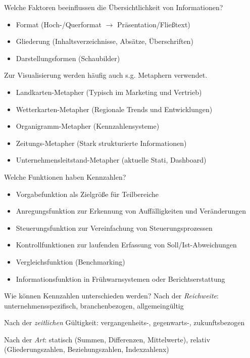 \documentclass[a6paper,10pt,grid=front%
,toc
]{kartei}
\begin{document}
  \begin{karte}{Welche Faktoren beeinflussen die Übersichtlichkeit von Informationen?}  

    \begin{itemize}
      \item Format (Hoch-/Querformat $\rightarrow$ Präsentation/Fließtext)
      \item Gliederung (Inhaltsverzeichnisse, Absätze, Überschriften)
      \item Darstellungsformen (Schaubilder)
    \end{itemize}

    Zur Visualisierung werden häufig auch s.g. Metaphern verwendet.

    \begin{itemize}
      \item Landkarten-Metapher (Typisch im Marketing und Vertrieb)
      \item Wetterkarten-Metapher (Regionale Trends und Entwicklungen)
      \item Organigramm-Metapher (Kennzahlensysteme)
      \item Zeitungs-Metapher (Stark strukturierte Informationen)
      \item Unternehmensleitstand-Metapher (aktuelle Stati, Dashboard)
    \end{itemize}
    
  \end{karte}

  \begin{karte}{Welche Funktionen haben Kennzahlen?}  
        
    \begin{itemize}
      \item Vorgabefunktion als Zielgröße für Teilbereiche
      \item Anregungsfunktion zur Erkennung von Auffälligkeiten und Veränderungen
      \item Steuerungsfunktion zur Vereinfachung von Steuerungsprozessen
      \item Kontrollfunktionen zur laufenden Erfassung von Soll/Ist-Abweichungen
      \item Vergleichsfunktion (Benchmarking)
      \item Informationsfunktion in Frühwarnsystemen oder Berichtserstattung
    \end{itemize}
  \end{karte} 

  \begin{karte}{Wie können Kennzahlen unterschieden werden?}  
    Nach der \textit{Reichweite}: unternehmensspezifisch, branchenbezogen, allgemeingültig

    Nach der \textit{zeitlichen} Gültigkeit: vergangenheits-, gegenwarts-, zukunftsbezogen

    Nach der \textit{Art}: statisch (Summen, Differenzen, Mittelwerte), relativ (Gliederungszahlen, Beziehungszahlen, Indexzahlenx)
  \end{karte}
\end{document}
